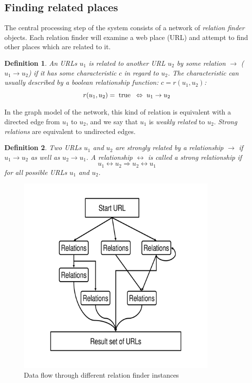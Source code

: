 \documentclass[a4paper]{danarticle}
\newtheorem{definition}{Definition}
\theoremstyle{remark}
\begin{document}
     \subsection{Finding related places} 
       The central processing step of the system consists of a network of
       \textit{relation finder} objects. Each relation finder will examine a web
       place (URL) and attempt to find other places which are related to it. 
       \begin{definition}
       An URLs $ u_1 $ is related to another URL $ u_2 $ by some relation 
       $ \rightarrow $
       ($ u_1 \rightarrow u_2 $) if it has some characteristic $ c $ in regard
       to $ u_2 $. The characteristic can usually described by a boolean
       relationship function: $ c = r(u_1, u_2) $:
       \[
         r(u_1, u_2) = \hspace{1mm} \mbox{true} \hspace{2mm} 
	 \Leftrightarrow \hspace{1mm} u_1 \rightarrow u_2
       \]
       \end{definition}
       In the graph model of the network, this kind of relation is equivalent
       with a directed edge from $ u_1 $ to $ u_2 $, and we say that $ u_1 $ is
       \textit{weakly related} to $ u_2 $. \textit{Strong relations} are
       equivalent to undirected edges.
       \begin{definition}
       Two URLs $ u_1 $ and $ u_2 $ are \emph{strongly related} by a relationship
       $ \rightarrow $ if $ u_1 \rightarrow u_2 $ as well as 
       $ u_2 \rightarrow u_1 $. A relationship $ \leftrightarrow $ is called a
       \emph{strong} relationship if
       \[
         u_1 \leftrightarrow u_2 \Rightarrow u_2 \leftrightarrow u_1 
       \]
       for all possible URLs $ u_1 $ and $ u_2 $.
       \end{definition}
       \begin{figure}[ht]
         \centering
	 \includegraphics[width=10cm]{relations}
	 \caption{Data flow through different relation finder instances}
	 \label{relations}
       \end{figure}
\end{document}
